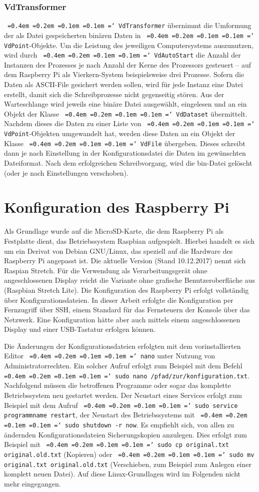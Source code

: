 \documentclass[a4paper,12pt,bibliography=totoc, listof=totoc,titlepage,pointlessnumbers]{scrreprt}
\newcommand*\justify{%
  \fontdimen2\font=0.4em%
  \fontdimen3\font=0.2em%
  \fontdimen4\font=0.1em%
  \fontdimen7\font=0.1em%
  \hyphenchar\font=`\-%
}
\newcommand{\code}[1]{\texttt{\justify{#1}}}
\begin{document}
\subsection{VdTransformer}
\code{VdTransformer} übernimmt die Umformung der als Datei gespeicherten binären Daten in \code{VdPoint}-Objekte. Um die Leistung des jeweiligen Computersystems auszunutzen, wird durch \code{VdAutoStart} die Anzahl der Instanzen des Prozesses je nach Anzahl der Kerne des Prozessors gesteuert -- auf dem Rasp\-berry Pi als Vierkern-System beispielsweise drei Prozesse. Sofern die Daten als ASCII-File gesichert werden sollen, wird für jede Instanz eine Datei erstellt, damit sich die Schreibprozesse nicht gegenseitig stören. Aus der Warteschlange wird jeweils eine binäre Datei ausgewählt, eingelesen und an ein Objekt der Klasse \code{VdDataset} übermittelt. Nachdem dieses die Daten zu einer Liste von \code{VdPoint}-Objekten umgewandelt hat, werden diese Daten an ein Objekt der Klasse \code{VdFile} übergeben. Dieses schreibt dann je nach Einstellung in der Konfigurationsdatei die Daten im gewünschten Dateiformat. Nach dem erfolgreichen Schreibvorgang, wird die bin-Datei gelöscht (oder je nach Einstellungen verschoben).

\chapter{Konfiguration des Rasp\-berry Pi}
\label{c:konfig}

Als Grundlage wurde auf die MicroSD-Karte, die dem Rasp\-berry Pi als Festplatte dient, das Betriebssystem Raspbian aufgespielt. Hierbei handelt es sich um ein Derivat von Debian GNU/Linux, das speziell auf die Hardware des Rasp\-berry Pi angepasst ist. Die aktuelle Version (Stand 10.12.2017) nennt sich Raspian Stretch. Für die Verwendung als Verarbeitungsgerät ohne angeschlossenen Display reicht die Variante ohne grafische Benutzeroberfläche aus (Raspbian Stretch Lite). Die Konfiguration des Rasp\-berry Pi erfolgt vollständig über Konfigurationsdateien. In dieser Arbeit erfolgte die Konfiguration per Fernzugriff über SSH, einem Standard für das Fernsteuern der Konsole über das Netzwerk. Eine Konfiguration hätte aber auch mittels einem angeschlossenen Display und einer USB-Tastatur erfolgen können.

Die Änderungen der Konfigurationsdateien erfolgten mit dem vorinstallierten Editor \code{nano} unter Nutzung von Administratorrechten. Ein solcher Aufruf erfolgt zum Beispiel mit dem Befehl \code{sudo nano /pfad/zur/konfiguration.txt}. Nachfolgend müssen die betroffenen Programme oder sogar das komplette Betriebssystem neu gestartet werden. Der Neustart eines Services erfolgt zum Beispiel mit dem Aufruf \code{sudo service programmname restart}, der Neustart des Betriebssystems mit \code{sudo shutdown -r now}. Es empfiehlt sich, von allen zu ändernden Konfigurationsdateien Sicherungskopien anzulegen. Dies erfolgt zum Beispiel mit \code{sudo cp original.txt original.old.txt} (Kopieren) oder \code{sudo mv original.txt original.old.txt} (Verschieben, zum Beispiel zum Anlegen einer komplett neuen Datei). Auf diese Linux-Grundlagen wird im Folgenden nicht mehr eingegangen.
\end{document}
